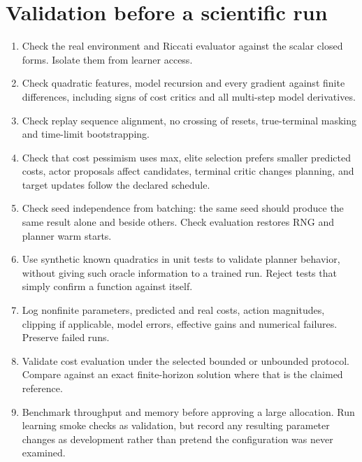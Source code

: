 \documentclass[11pt]{article}
\begin{document}
\section{Validation before a scientific run}

\begin{enumerate}

\item Check the real environment and Riccati evaluator against the scalar closed forms. Isolate them from learner access.

\item Check quadratic features, model recursion and every gradient against finite differences, including signs of cost critics and all multi-step model derivatives.

\item Check replay sequence alignment, no crossing of resets, true-terminal masking and time-limit bootstrapping.

\item Check that cost pessimism uses max, elite selection prefers smaller predicted costs, actor proposals affect candidates, terminal critic changes planning, and target updates follow the declared schedule.

\item Check seed independence from batching: the same seed should produce the same result alone and beside others. Check evaluation restores RNG and planner warm starts.

\item Use synthetic known quadratics in unit tests to validate planner behavior, without giving such oracle information to a trained run. Reject tests that simply confirm a function against itself.

\item Log nonfinite parameters, predicted and real costs, action magnitudes, clipping if applicable, model errors, effective gains and numerical failures. Preserve failed runs.

\item Validate cost evaluation under the selected bounded or unbounded protocol. Compare against an exact finite-horizon solution where that is the claimed reference.

\item Benchmark throughput and memory before approving a large allocation. Run learning smoke checks as validation, but record any resulting parameter changes as development rather than pretend the configuration was never examined.

\end{enumerate}
\end{document}
